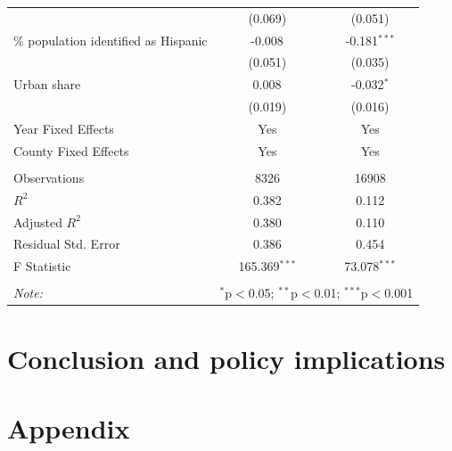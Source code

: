 \documentclass[12pt,twoside,letterpaper]{article}
\begin{document}
\begin{table}[!htbp]
{\begin{tabular}{@{\extracolsep{5pt}}lcc}
& (0.069) & (0.051) \\
 \% population identified as Hispanic & -0.008$^{}$ & -0.181$^{***}$ \\
& (0.051) & (0.035) \\
 Urban share & 0.008$^{}$ & -0.032$^{*}$ \\
& (0.019) & (0.016) \\
 Year Fixed Effects & Yes & Yes \\
 County Fixed Effects & Yes & Yes \\
\hline \\[-1.8ex]
 Observations & 8326 & 16908 \\
 $R^2$ & 0.382 & 0.112 \\
 Adjusted $R^2$ & 0.380 & 0.110 \\
 Residual Std. Error & 0.386 & 0.454 \\
 F Statistic & 165.369$^{***}$ & 73.078$^{***}$ \\
\hline
\hline \\[-1.8ex]
\textit{Note:} & \multicolumn{2}{r}{$^{*}$p$<$0.05; $^{**}$p$<$0.01; $^{***}$p$<$0.001} \\
\end{tabular}}
\end{table}


\newpage
\section[Conclusion]{Conclusion and policy implications}



\newpage
\appendix
{}
\section[Appendix]{Appendix}
\end{document}
